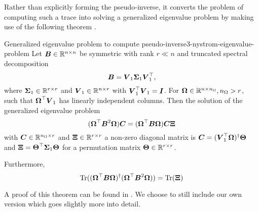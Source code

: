 Rather than explicitly forming the pseudo-inverse,
it converts the problem of computing such a trace into solving a generalized
eigenvalue problem by making use of the following theorem \cite[theorem~3]{lin2017randomized}.

\begin{theorem}{Generalized eigenvalue problem to compute pseudo-inverse}{3-nystrom-eigenvalue-problem}
    Let $\boldsymbol{B} \in \mathbb{R}^{n \times n}$ be symmetric with rank $r \ll n$ and
    truncated spectral decomposition 
    \begin{equation}
        \boldsymbol{B} = \boldsymbol{V}_1 \boldsymbol{\Sigma}_1 \boldsymbol{V}_1^{\top},
        \label{equ:3-nystrom-eigenvalue-problem-spectral-decomposition}
    \end{equation}
    where $\boldsymbol{\Sigma}_1 \in \mathbb{R}^{r \times r}$ and
    $\boldsymbol{V}_1 \in \mathbb{R}^{n \times r}$ with $\boldsymbol{V}_1^{\top} \boldsymbol{V}_1 = \boldsymbol{I}$.
    For $\boldsymbol{\Omega} \in \mathbb{R}^{n \times n_{\Omega}}, n_{\Omega} > r$,
    such that $\boldsymbol{\Omega}^{\top} \boldsymbol{V}_1$ has linearly independent columns.
    Then the solution of the generalized eigenvalue problem
    \begin{equation}
        (\boldsymbol{\Omega}^{\top} \boldsymbol{B}^2 \boldsymbol{\Omega}) \boldsymbol{C} = (\boldsymbol{\Omega}^{\top} \boldsymbol{B} \boldsymbol{\Omega}) \boldsymbol{C}  \boldsymbol{\Xi}
        \label{equ:3-nystrom-low-rank-eigenvalue-problem}
    \end{equation}
    with $\boldsymbol{C} \in \mathbb{R}^{n_{\Omega} \times r}$ and $\boldsymbol{\Xi} \in \mathbb{R}^{r \times r}$ a 
    non-zero diagonal matrix is $\boldsymbol{C} = (\boldsymbol{V}_1^{\top} \boldsymbol{\Omega})^{\dagger} \boldsymbol{\Theta}$
    and $\boldsymbol{\Xi} = \boldsymbol{\Theta}^{\top} \boldsymbol{\Sigma}_1 \boldsymbol{\Theta}$
    for a permutation matrix $\boldsymbol{\Theta} \in \mathbb{R}^{r \times r}$.

    Furthermore,
    \begin{equation}
        \operatorname{Tr}((\boldsymbol{\Omega}^{\top} \boldsymbol{B} \boldsymbol{\Omega})^{\dagger}(\boldsymbol{\Omega}^{\top} \boldsymbol{B}^2 \boldsymbol{\Omega})) = \operatorname{Tr}(\boldsymbol{\Xi})
        \label{equ:3-nystrom-low-rank-trace-equalities}
    \end{equation}
\end{theorem}
A proof of this theorem can be found in \cite[theorem~3]{lin2017randomized}. We
choose to still include our own version which goes slightly more into detail.
